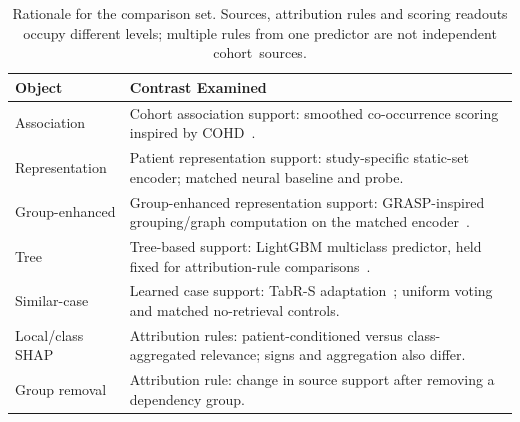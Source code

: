 \begin{table}[H]
\caption{{Rationale} 
 for the comparison set. Sources, attribution rules and scoring readouts occupy different levels; multiple rules from one predictor are not independent cohort~sources.}
\label{tab:method-selection}
\begin{tabularx}{\textwidth}{lL}\toprule
\textbf{Object} & \textbf{Contrast Examined} \\ \midrule
Association & Cohort association support: smoothed co-occurrence scoring inspired by COHD~\cite{code_cohd}. \\\midrule
Representation & Patient representation support: study-specific static-set encoder; matched neural baseline and probe. \\\midrule
Group-enhanced & Group-enhanced representation support: GRASP-inspired grouping/graph computation on the matched encoder~\cite{code_grasp}. \\\midrule
Tree & Tree-based support: LightGBM multiclass predictor, held fixed for attribution-rule comparisons~\cite{code_lightgbm}. \\\midrule
Similar-case & Learned case support: TabR-S adaptation~\cite{code_tabr}; uniform voting and matched no-retrieval controls. \\\midrule
Local/class SHAP & Attribution rules: patient-conditioned versus class-aggregated relevance; signs and aggregation also differ. \\\midrule
Group removal & Attribution rule: change in source support after removing a dependency group. \\
\bottomrule\end{tabularx}\end{table}
